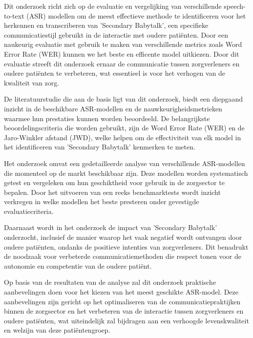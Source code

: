 Dit onderzoek richt zich op de evaluatie en vergelijking van verschillende speech-to-text (ASR) modellen om de meest effectieve methode te identificeren voor het herkennen en transcriberen van 'Secondary Babytalk', een specifieke communicatiestijl gebruikt in de interactie met oudere patiënten. Door een naukeurig evaluatie met gebruik te maken van verschillende metrics zoals Word Error Rate (WER) kunnen we het beste en efficente model uitkiezen. Door dit evaluatie streeft dit  onderzoek ernaar de communicatie tussen zorgverleners en oudere patiënten te verbeteren, wat essentieel is voor het verhogen van de kwaliteit van zorg.

De literatuurstudie die aan de basis ligt van dit onderzoek, biedt een diepgaand inzicht in de beschikbare ASR-modellen en de nauwkeurigheidsmetrieken waarmee hun prestaties kunnen worden beoordeeld. De belangrijkste beoordelingscriteria die worden gebruikt, zijn de Word Error Rate (WER) en de Jaro-Winkler afstand (JWD), welke helpen om de effectiviteit van elk model in het identificeren van 'Secondary Babytalk' kenmerken te meten.

Het onderzoek omvat een gedetailleerde analyse van verschillende ASR-modellen die momenteel op de markt beschikbaar zijn. Deze modellen worden systematisch getest en vergeleken om hun geschiktheid voor gebruik in de zorgsector te bepalen. Door het uitvoeren van een reeks benchmarktests wordt inzicht verkregen in welke modellen het beste presteren onder gevestigde evaluatiecriteria.

Daarnaast wordt in het onderzoek de impact van 'Secondary Babytalk' onderzocht, inclusief de manier waarop het vaak negatief wordt ontvangen door oudere patiënten, ondanks de positieve intenties van zorgverleners. Dit benadrukt de noodzaak voor verbeterde communicatiemethoden die respect tonen voor de autonomie en competentie van de oudere patiënt.

Op basis van de resultaten van de analyse zal dit onderzoek praktische aanbevelingen doen voor het kiezen van het meest geschikte ASR-model. Deze aanbevelingen zijn gericht op het optimaliseren van de communicatiepraktijken binnen de zorgsector en het verbeteren van de interactie tussen zorgverleners en oudere patiënten, wat uiteindelijk zal bijdragen aan een verhoogde levenskwaliteit en welzijn van deze patiëntengroep.

